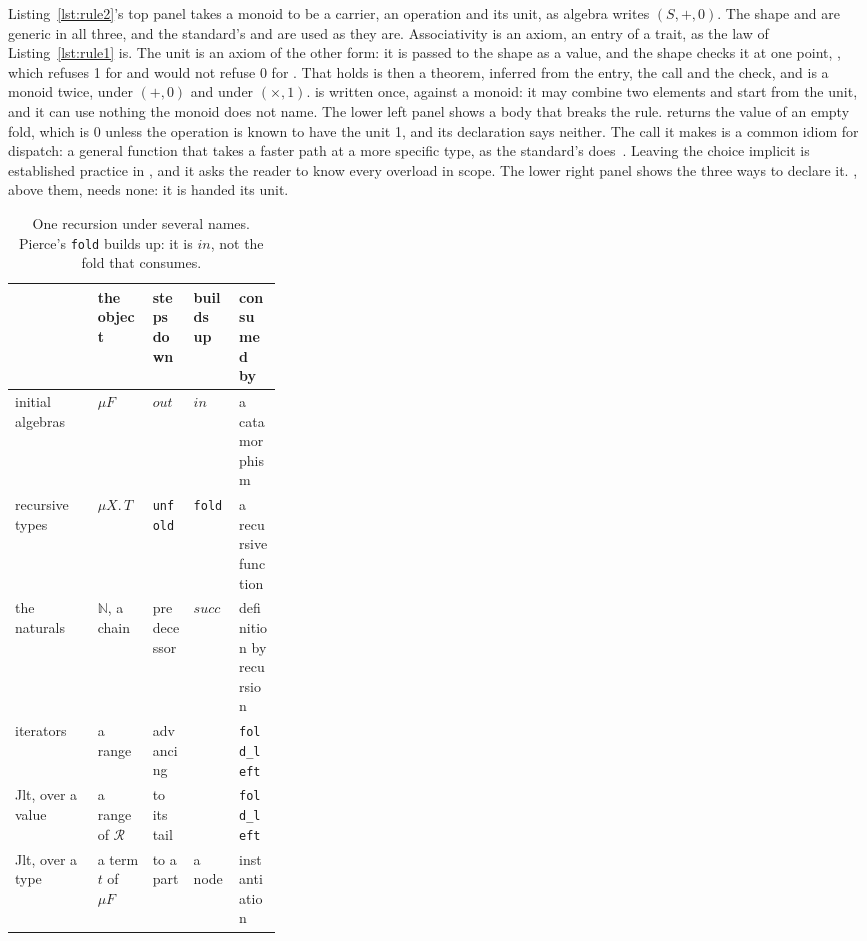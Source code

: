 Listing~\ref{lst:rule2}'s top panel takes a monoid to be a carrier, an operation and its unit, as algebra writes $(S, +, 0)$.
The shape and  are generic in all three, and the standard's  and  are used as they are.
Associativity is an axiom, an entry of a trait, as the law of Listing~\ref{lst:rule1} is.
The unit is an axiom of the other form: it is passed to the shape as a value, and the shape checks it at one point, , which refuses 1 for  and would not refuse 0 for .
That  holds is then a theorem, inferred from the entry, the call and the check, and  is a monoid twice, under $(+, 0)$ and under $(\times, 1)$.
 is written once, against a monoid: it may combine two elements and start from the unit, and it can use nothing the monoid does not name.
The lower left panel shows a body that breaks the rule.
 returns the value of an empty fold, which is 0 unless the operation is known to have the unit 1, and its declaration says neither.
The call it makes is a common idiom for dispatch: a general function that takes a faster path at a more specific type, as the standard's  does~\cite[{\texttt{range.iter.op.advance}}]{cpp23standard}.
Leaving the choice implicit is established practice in \Cpp{}, and it asks the reader to know every overload in scope.
The lower right panel shows the three ways to declare it.
, above them, needs none: it is handed its unit.

\begin{table}[tb]
\centering
\small
\begin{tabularx}{\linewidth}{@{}>{\raggedright\arraybackslash}p{0.31\linewidth}>{\raggedright\arraybackslash}X>{\raggedright\arraybackslash}X>{\raggedright\arraybackslash}X>{\raggedright\arraybackslash}X@{}}
\toprule
 & the object & steps down & builds up & consumed by \\
\midrule
initial algebras~\cite{lambek1968fixpoint,meijer1991functional} & $\mu F$ & $\mathit{out}$ & $\mathit{in}$ & a catamorphism \\
recursive types~\cite[ch.~20]{pierce2002tapl} & $\mu X.\,T$ & \texttt{unfold} & \texttt{fold} & a recursive function \\
the naturals~\cite{peano1889arithmetices,dedekind1888zahlen,lawvere1964etcs} & $\mathbb{N}$, a chain & predecessor & $\mathit{succ}$ & definition by recursion \\
iterators~\cite{stepanov2009elements,cpp23standard} & a range & advancing & & \texttt{fold\_left} \\
\midrule
Jlt, over a value & a range of $\mathcal{R}$ & to its tail & & \texttt{fold\_left} \\
Jlt, over a type & a term $t$ of $\mu F$ & to a part & a node & instantiation \\
\bottomrule
\end{tabularx}
\caption{One recursion under several names.
Pierce's \texttt{fold} builds up: it is $\mathit{in}$, not the fold that consumes.}
\label{tab:recursion-names}
\end{table}

